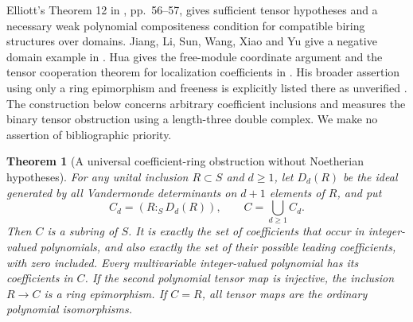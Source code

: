 \documentclass[11pt,a4paper]{article}
\newtheorem{theorem}{Theorem}[section]
\theoremstyle{definition}
\begin{document}
Elliott's Theorem 12 in \cite{Elliott2010}, pp.~56--57, gives sufficient
tensor hypotheses and a necessary weak polynomial compositeness condition
for compatible biring structures over domains.  Jiang, Li, Sun, Wang,
Xiao and Yu give a negative domain example in \cite[\S3.4]{Rethlas2026}.
Hua gives the free-module coordinate argument and the tensor cooperation
theorem for localization coefficients in
\cite[\S34, pp.~155--157]{HuaMontpellier2026}.  His broader assertion
using only a ring epimorphism and freeness is explicitly listed there
as unverified \cite[Theorem~34.6, p.~160]{HuaMontpellier2026}.
The construction below concerns arbitrary coefficient inclusions and
measures the binary tensor obstruction using a length-three double
complex.  We make no assertion of bibliographic priority.
\begin{theorem}[A universal coefficient-ring obstruction without Noetherian hypotheses]\label{result-19}
For any unital inclusion $R\subset S$ and $d\ge1$,
let $D_d(R)$ be the ideal generated by all
Vandermonde determinants on $d+1$ elements of $R$,
and put
\begin{equation}
 C_d=(R:_S D_d(R)),\qquad C=\bigcup_{d\ge1}C_d.           \label{equation-49}
\end{equation}
Then $C$ is a subring of $S$. It is exactly the
set of coefficients that occur in integer-valued
polynomials, and also exactly the set of their
possible leading coefficients, with zero included. Every multivariable
integer-valued polynomial has its coefficients in
$C$. If the second polynomial tensor map is
injective, the inclusion $R\to C$ is a ring
epimorphism. If $C=R$, all tensor maps are the
ordinary polynomial isomorphisms.
\end{theorem}
\end{document}
